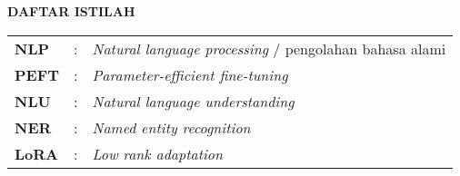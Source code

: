 \newpage
\begin{center}
    \Large \bfseries{DAFTAR ISTILAH}
    \bigskip

    \begin{table}[h]
        \begin{tabularx}{\textwidth}{lcX}
            \textbf{NLP} & : & \textit{Natural language processing} / pengolahan bahasa alami \\
            \textbf{PEFT} & : & \textit{Parameter-efficient fine-tuning} \\
            \textbf{NLU} & : & \textit{Natural language understanding} \\
            \textbf{NER} & : & \textit{Named entity recognition} \\
            \textbf{LoRA} & : & \textit{Low rank adaptation} \\
        \end{tabularx}
    \end{table}
\end{center}
